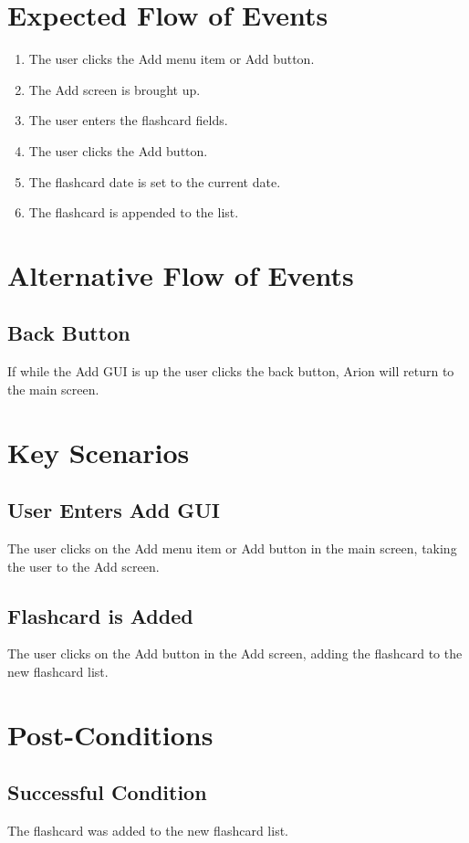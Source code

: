 \documentclass{scrreprt}
\begin{document}
\section{Expected Flow of Events}
\begin{enumerate}[1.]
    \item The user clicks the Add menu item or Add button.
    \item The Add screen is brought up.
    \item The user enters the flashcard fields.
    \item The user clicks the Add button.
    \item The flashcard date is set to the current date.
    \item The flashcard is appended to the list.
\end{enumerate}

\section{Alternative Flow of Events}

    \subsection{Back Button}
    If while the Add GUI is up the user clicks the back button,
    Arion will return to the main screen.


\section{Key Scenarios}
    \subsection{User Enters Add GUI}
    The user clicks on the Add menu item or Add button in the main screen,
    taking the user to the Add screen.

    \subsection{Flashcard is Added}
    The user clicks on the Add button in the Add screen, adding the flashcard to
    the new flashcard list.

\section{Post-Conditions}
    \subsection{Successful Condition}
    The flashcard was added to the new flashcard list.
    
\end{document}
